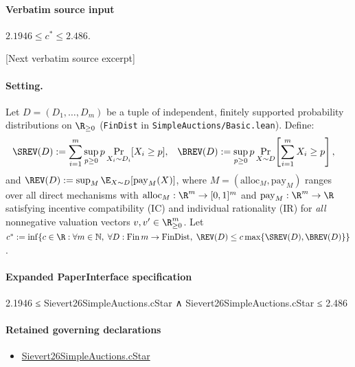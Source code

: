 \documentclass[10pt]{article}
\begin{document}
\paragraph{Verbatim source input}
\begin{ReviewVerbatim}
\begin{corollary}\label{cor:bracket}
$2.1946 \le c^* \le 2.486$.
\end{corollary}

[Next verbatim source excerpt]

\paragraph{Setting.}
Let $D = (D_1, \dots, D_m)$ be a tuple of independent, finitely supported probability distributions on $\R_{\ge 0}$ (\texttt{FinDist} in \texttt{SimpleAuctions/Basic.lean}). Define:
\begin{align*}
  \SREV(D) &:= \sum_{i=1}^m \sup_{p \ge 0} p \Pr_{X_i \sim D_i}[X_i \ge p], &
  \BREV(D) &:= \sup_{p \ge 0} p \Pr_{X \sim D}\!\left[\sum_{i=1}^m X_i \ge p\right],
\end{align*}
and $\REV(D) := \sup_{M} \E_{X \sim D}[\mathrm{pay}_M(X)]$, where $M = (\mathrm{alloc}_M, \mathrm{pay}_M)$ ranges over all direct mechanisms with $\mathrm{alloc}_M : \R^m \to [0,1]^m$ and $\mathrm{pay}_M : \R^m \to \R$ satisfying incentive compatibility (IC) and individual rationality (IR) for \emph{all} nonnegative valuation vectors $v, v' \in \R_{\ge 0}^m$. Let $c^* := \inf\{c \in \R : \forall m \in \mathbb{N},\; \forall D : \mathrm{Fin}\,m \to \mathrm{FinDist},\; \REV(D) \le c \max\{\SREV(D),\BREV(D)\}\}$.
\end{ReviewVerbatim}



\paragraph{Expanded PaperInterface specification}
\begin{ReviewVerbatim}
2.1946 ≤ Sievert26SimpleAuctions.cStar ∧ Sievert26SimpleAuctions.cStar ≤ 2.486
\end{ReviewVerbatim}

\paragraph{Retained governing declarations}
\begin{itemize}\raggedright
\item \hyperlink{paper-prerequisite-3b350509c2b8610a}{Sievert26\allowbreak{}Simple\allowbreak{}Auctions.\allowbreak{}c\allowbreak{}Star}
\end{itemize}
\end{document}
